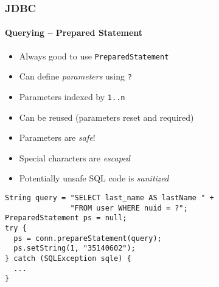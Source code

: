 \documentclass{beamer}
\begin{document}
\begin{frame}
  \frametitle{JDBC}
  \framesubtitle{Querying -- Prepared Statement}

\begin{itemize}
  \item Always good to use \texttt{PreparedStatement}
  \item Can define \emph{parameters} using \texttt{?}
  \item Parameters indexed by \texttt{1..n}
  \item Can be reused (parameters reset and required)
  \item Parameters are \emph{safe}!
  \item Special characters are \emph{escaped} 
  \item Potentially unsafe SQL code is \emph{sanitized}	
\end{itemize}

\framebreak

\begin{verbatim}
String query = "SELECT last_name AS lastName " + 
               "FROM user WHERE nuid = ?";
PreparedStatement ps = null;
try {
  ps = conn.prepareStatement(query);
  ps.setString(1, "35140602");
} catch (SQLException sqle) {
  ...
}
\end{verbatim}

\end{frame}
\end{document}
